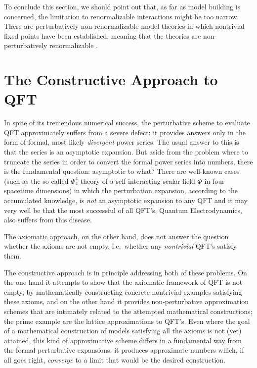 \documentclass[multphys,vecphys]{svmult}
\begin{document}
To conclude this section, we should point out that, as far as model
building is concerned, the limitation to
renormalizable interactions might be too
narrow. There are perturbatively
non-renormalizable model theories   
in which nontrivial fixed points have been established, meaning that the
theories are non-perturbatively
renormalizable \cite{GK}.  

\section{The Constructive Approach to QFT}\label{construct}

In spite of its tremendous numerical success, the
perturbative scheme to evaluate QFT
approximately suffers from a severe defect: it provides answers  
only in the form of formal, most likely {\it divergent} power series.
The usual answer to this is that the series is an asymptotic expansion. 
But aside from the problem where to truncate the series in order to 
convert the formal power series into numbers, there is the fundamental 
question: asymptotic to what? There are well-known cases (such as the 
so-called $\Phi^4_4$ theory of a self-interacting scalar field $\Phi$
in four spacetime dimensions) in which the perturbation expansion, 
according to the accumulated knowledge, is {\it not} an asymptotic 
expansion to any QFT and it may very well be that the most successful of 
all QFT's, Quantum Electrodynamics, also suffers from this disease.
  
The axiomatic approach, on the other hand,
does not answer the question whether the axioms are not empty, i.e.\
whether any {\it nontrivial} QFT's satisfy them.

The constructive approach is in principle
addressing both of these problems. On the one hand it attempts to show
that the axiomatic framework of QFT is not empty, by mathematically
constructing concrete nontrivial examples satisfying these axioms, and
on the other hand it provides non-perturb\index{non-perturbative
  methods}ative approximation schemes that are intimately related to
the attempted mathematical constructions; the prime example are the
lattice\index{lattice approximation} approximations to QFT's. Even
where the goal of a mathematical construction of  models satisfying
all the axioms is not (yet) attained, this kind of approximative
scheme differs in a fundamental way from the formal perturbative
expansions: it produces approximate numbers which, if all goes right,
{\it converge} to a limit that would be the desired construction.
\end{document}
